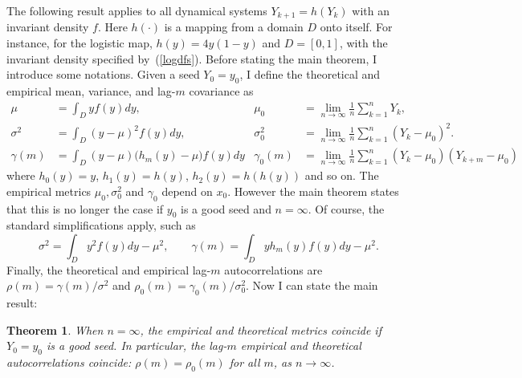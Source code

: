 \documentclass[oneside,10pt]{book}
\newtheorem{theorem}{Theorem}[section]
\begin{document}
The following result applies to all dynamical systems $Y_{k+1} = h(Y_k)$ with an invariant density $f$.  Here $h(\cdot)$ is a mapping from a domain $D$ onto itself. For instance, for the logistic map, $h(y)=4y(1-y)$ and $D=[0, 1]$, with the invariant density
 specified by~(\ref{logdfs}). Before stating the main theorem, I introduce some notations. Given a seed $Y_0=y_0$, 
I define the theoretical and empirical mean, variance, and lag-$m$ covariance  as
\begin{align}
 \mu  & =  \int_D y f(y)dy,                    & \mu_0  & =  \lim_{n\rightarrow\infty} \frac{1}{n}\sum_{k=1}^n Y_k, \nonumber \\
\sigma^2  & =  \int_D(y-\mu)^2f(y)dy,  & \sigma_0^2  & =  \lim_{n\rightarrow\infty} \frac{1}{n}\sum_{k=1}^n (Y_k -\mu_0)^2. \nonumber \\
\gamma(m) & =\int_D (y-\mu) \Big(h_m(y)-\mu\Big)f(y)dy & \gamma_0(m) & = \lim_{n\rightarrow\infty} \frac{1}{n}\sum_{k=1}^n (Y_k -\mu_0)(Y_{k+m}-\mu_0) \nonumber \nonumber
\end{align}
where $h_0(y)=y$, $h_1(y)=h(y)$, $h_2(y)=h(h(y))$ and  so on.  The
 empirical metrics $\mu_0,\sigma^2_0$ and $\gamma_0$ depend on $x_0$. However the main theorem states that this is no longer the case
 if $y_0$ is a \textcolor{index}{good seed} and $n=\infty$. Of course, the standard simplifications apply, such as 
$$
\sigma^2   =  \int_D y^2f(y)dy - \mu^2, \quad\quad  \gamma(m)  =\int_D y h_m(y) f(y)dy -\mu^2.
$$
Finally, the theoretical and empirical lag-$m$ autocorrelations are  
$\rho(m)=\gamma(m)/\sigma^2$ and  $\rho_0(m)=\gamma_0(m)/\sigma_0^2$. Now I can state the main result:

\begin{theorem}\label{vgfd}
When $n=\infty$, the empirical and theoretical metrics coincide if $Y_0=y_0$ is a good seed. In particular, the lag-$m$ empirical and theoretical autocorrelations coincide: $\rho(m)=\rho_0(m)$ for all $m$, as $n\rightarrow\infty$.
\end{theorem}
\end{document}
